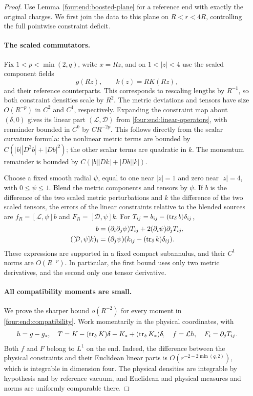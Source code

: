 \begin{proof}
Use Lemma~\ref{four:end:boosted-plane} for a reference end with exactly the
original charges. We first join the data to this plane on
\(R<r<4R\), controlling the full pointwise constraint deficit.

\paragraph{The scaled commutators.}
Fix \(1<p<\min(2,q)\), write \(x=Rz\), and on
\(1<|z|<4\) use the scaled component fields
\[
 g(Rz),\qquad k(z)=RK(Rz),
\]
and their reference counterparts. This corresponds to rescaling lengths
by \(R^{-1}\), so both constraint densities scale by \(R^2\).
The metric deviations and tensors have size \(O(R^{-p})\) in
\(C^2\) and \(C^1\), respectively. Expanding the constraint map about
\((\delta,0)\) gives its linear part
\((\mathcal L,\mathcal D)\) from \eqref{four:end:linear-operators}, with
remainder bounded in \(C^0\) by \(CR^{-2p}\). This follows directly
from the scalar curvature formula: the nonlinear metric terms are
bounded by \(C(|b||D^2b|+|Db|^2)\); the other scalar terms are quadratic
in \(k\). The momentum remainder is bounded by
\(C(|b||Dk|+|Db||k|)\).

Choose a fixed smooth radial \(\psi\), equal to one near \(|z|=1\)
and zero near \(|z|=4\), with \(0\le\psi\le1\). Blend the metric
components and tensors by \(\psi\). If \(b\) is the difference of
the two scaled metric perturbations and \(k\) the difference of the
two scaled tensors, the errors of the linear constraints relative to
the blended sources are
\(f_R=[\mathcal L,\psi]b\) and
\(F_R=[\mathcal D,\psi]k\). For \(T_{ij}=b_{ij}-(\operatorname{tr}_\delta b)\delta_{ij}\),
\begin{align}
 [\mathcal L,\psi]b
   &=(\partial_i\partial_j\psi)T_{ij}
       +2(\partial_i\psi)\partial_jT_{ij},\label{four:end:scalar-commutator}\\
 ([\mathcal D,\psi]k)_i
   &=(\partial_j\psi)(k_{ij}-(\tr_\delta k)\delta_{ij}).
       \label{four:end:vector-commutator}
\end{align}
These expressions are supported in a fixed compact subannulus, and
their \(C^1\) norms are \(O(R^{-p})\). In particular, the first bound
uses only two metric derivatives, and the second only one tensor
derivative.

\paragraph{All compatibility moments are small.}
We prove the sharper bound \(o(R^{-2})\) for every moment in
\eqref{four:end:compatibility}. Work momentarily in the physical coordinates,
with
\[
 h=g-g_*,\quad
 T=K-(\operatorname{tr}_\delta K)\delta-K_*+(\operatorname{tr}_\delta K_*)\delta,
 \quad f=\mathcal Lh,\quad F_i=\partial_jT_{ij}.
\]
Both \(f\) and \(F\) belong to \(L^1\) on the end. Indeed, the
difference between the physical constraints and their Euclidean linear
parts is \(O(r^{-2-2\min(q,2)})\), which is integrable in dimension
four. The physical densities are integrable by hypothesis and by
reference vacuum, and Euclidean and physical measures and norms are
uniformly comparable there.


\end{proof}
